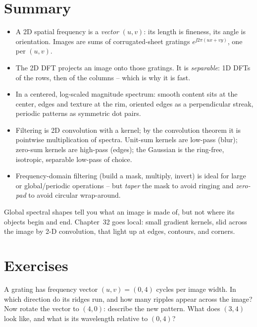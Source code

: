 \section{Summary}
\label{ch31:summary}

\begin{itemize}
\item A 2D spatial frequency is a \emph{vector} $(u,v)$: its length is fineness,
its angle is orientation. Images are sums of corrugated-sheet gratings
$e^{\jj2\pi(ux+vy)}$, one per $(u,v)$.
\item The 2D DFT projects an image onto those gratings. It is \emph{separable}:
1D DFTs of the rows, then of the columns -- which is why it is fast.
\item In a centered, log-scaled magnitude spectrum: smooth content sits at the
center, edges and texture at the rim, oriented edges as a perpendicular streak,
periodic patterns as symmetric dot pairs.
\item Filtering is 2D convolution with a kernel; by the convolution theorem it is
pointwise multiplication of spectra. Unit-sum kernels are low-pass (blur);
zero-sum kernels are high-pass (edges); the Gaussian is the ring-free, isotropic,
separable low-pass of choice.
\item Frequency-domain filtering (build a mask, multiply, invert) is ideal for large
or global/periodic operations -- but \emph{taper} the mask to avoid ringing and
\emph{zero-pad} to avoid circular wrap-around.
\end{itemize}

Global spectral shapes tell you what an image is made of, but not where its
objects begin and end. Chapter~32 goes local: small gradient kernels, slid across
the image by 2-D convolution, that light up at edges, contours, and corners.

\section{Exercises}
\label{ch31:exercises}

\begin{exercise}
\label{ch31:ex-direction}
A grating has frequency vector $(u,v)=(0,4)$ cycles per image width. In which
direction do its ridges run, and how many ripples appear across the image? Now
rotate the vector to $(4,0)$: describe the new pattern. What does $(3,4)$ look
like, and what is its wavelength relative to $(0,4)$?
\end{exercise}


